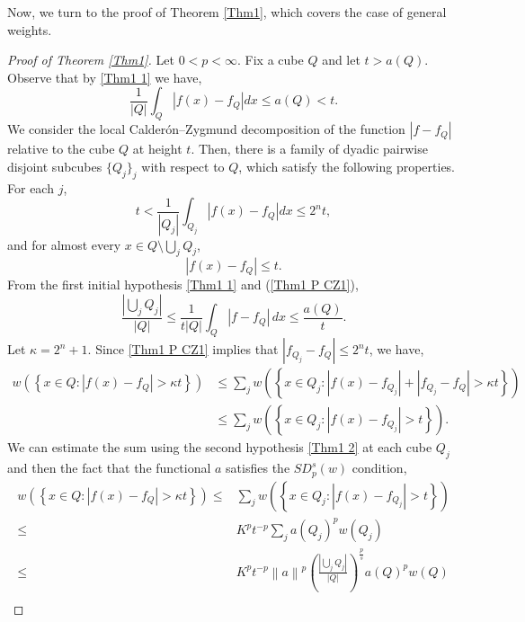 \documentclass[reqno, 10pt, oneside]{amsart}
\numberwithin{equation}{section}
\numberwithin{theorem}{section}
\newcommand{\1}{{\rm 1\hspace*{-0.4ex}%
\rule{0.1ex}{1.52ex}\hspace*{0.2ex}}}
\begin{document}
Now, we turn to the proof of Theorem \ref{Thm1}, which covers the case of general weights.




\begin{proof}[Proof of Theorem \ref{Thm1}] 
Let $0<p<\infty$. Fix a cube $Q$ and let $t>a(Q)$. Observe that by \eqref{Thm1 1} we have,
	\begin{equation*}
		\frac{1}{|Q|}\int_Q |f(x)-f_Q| dx \le a(Q) < t.
	\end{equation*}
%		
We consider the local Calder\'on--Zygmund decomposition of the function $|f-f_Q|$ relative to the cube $Q$ at height $t$. Then, there is a family of dyadic pairwise disjoint subcubes $\{Q_j\}_j$ with respect to $Q$, which satisfy the following properties. For each $j$,
    \begin{equation}\label{Thm1 P CZ1}
	t<\frac{1}{|Q_{j}|}\int_{Q_{j}} |f(x)-f_Q| dx \le 2^n t,
	\end{equation}   
    and for almost every $x\in Q\setminus \bigcup_j Q_{j}$, 			
    \begin{equation*}
		|f(x)-f_Q| \le t.
	\end{equation*}
    From  the first initial hypothesis \eqref{Thm1 1}  and (\ref{Thm1 P CZ1}), 		\begin{equation}\label{Thm1 P CZ2}
		\frac{\left| \bigcup_j Q_j \right| }{|Q|}	\le \frac{1}{t|Q|}\int_{Q}|f-f_Q| \, dx \le \frac{a(Q)}{t}.
	\end{equation}
Let $\kappa=2^n + 1$. Since \eqref{Thm1 P CZ1} implies that $|f_{Q_j}-f_Q| \le 2^nt$, 
we have, 
%
\begin{align*}
w\left(  \left\lbrace x\in Q : |f(x)-f_Q| > \kappa t \right\rbrace \right)  & \le  \sum_j w\left(  \left\lbrace x\in Q_{j} : |f(x)-f_{Q_{j}}|+|f_{Q_j}-f_Q| > \kappa t \right\rbrace\right) \\
& \le  \sum_j w\left(  \left\lbrace x\in Q_{j} : |f(x)-f_{Q_{j}}| > t \right\rbrace\right). 
\end{align*}
	We can estimate the sum using the second hypothesis   \eqref{Thm1 2} at each cube $Q_j$ and then the fact that the functional $a$ satisfies the $SD_p^s(w)$ condition, 
		\begin{align*}
			w\left(  \left\lbrace x\in Q : |f(x)-f_Q| > \kappa t \right\rbrace \right)   \le & \sum_j w\left(  \left\lbrace x\in Q_{j} : |f(x)-f_{Q_{j}}| > t \right\rbrace\right)   \\
			\le & K^p t^{-p}  \sum_j    a(Q_{j})^p w(Q_{j})   \\
			\le &  K^p t^{-p} \left\| a \right\| ^p \left( \frac{\left| \bigcup_j Q_j \right|}{|Q|} \right)^\frac{p}{s} a(Q)^p w(Q)\\

\end{align*}
\end{proof}
\end{document}
